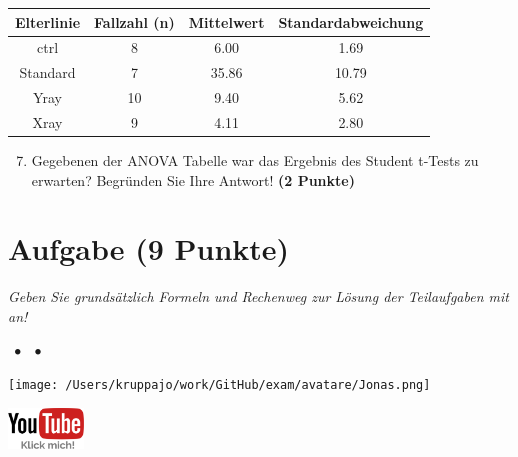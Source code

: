 \documentclass[a4paper, 9pt]{scrartcl}\usepackage[]{graphicx}\usepackage[]{xcolor}
\newenvironment{knitrout}{}{} %
\begin{document}
\begin{knitrout}
\color{fgcolor}\begin{table}[!h]
\centering\begingroup\fontsize{11}{13}\selectfont

\begin{tabular}{cccc}
\toprule
\textbf{Elterlinie} & \textbf{Fallzahl (n)} & \textbf{Mittelwert} & \textbf{Standardabweichung}\\
\midrule
ctrl & 8 & 6.00 & 1.69\\
Standard & 7 & 35.86 & 10.79\\
Yray & 10 & 9.40 & 5.62\\
Xray & 9 & 4.11 & 2.80\\
\bottomrule
\end{tabular}
\endgroup{}
\end{table}

\end{knitrout}


\begin{enumerate}
  \setcounter{enumi}{6}
\item Gegebenen der ANOVA Tabelle war das Ergebnis des Student t-Tests zu erwarten? Begründen Sie Ihre Antwort! \textbf{(2 Punkte)}
\end{enumerate}

 
\clearpage

\section{Aufgabe \hfill (9 Punkte)}

\textit{Geben Sie grundsätzlich Formeln und Rechenweg zur Lösung der Teilaufgaben mit an!} \\[1Ex]
 

 
\ifcollection
\begin{flushright}
\tiny\vspace{-3Ex}
\textbf{\examinhaltstart}
\exammodulemathstat $\;\bullet$
\exammodulestat $\;\bullet$
\exammodulestatbbv
\vspace{-4Ex}
\end{flushright}
\begin{minipage}[t]{0.5\textwidth}
\texttt{[image: /Users/kruppajo/work/GitHub/exam/avatare/Jonas.png]}
\end{minipage}
\begin{minipage}[t]{0.5\textwidth}
\hfill
\href{https://youtu.be/aXvxGC4YLqk}{\includegraphics[width = 2cm]{img/youtube}}
\end{minipage}
\vspace{-3Ex}
\fi
\end{document}
